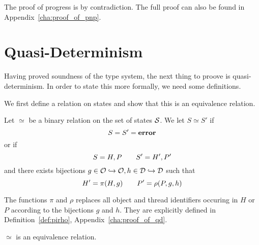 The proof of progress is by contradiction. The full proof can also be found in
Appendix~\ref{cha:proof_of_pnp}.

\section{Quasi-Determinism}%
\label{sec:quasi_determinism}

Having proved soundness of the type system, the next thing to proove is
quasi-determinism. In order to state this more formally, we need some
definitions.

We first define a relation on states and show that this is an equivalence
relation.
\begin{definition} \label{def:eqrel}
  Let $\simeq$ be a binary relation on the set of states $\mathcal{S}$.
  We let $S \simeq S'$ if
  \begin{equation*}
    S = S' = \mbox{{\bf error}}
  \end{equation*}
  or if
  \begin{equation}
    S = H, P \quad\quad S' = H', P'
  \end{equation}
  and there exists bijections $g \in \mathcal{O} \hookrightarrow \mathcal{O}, h \in \mathcal{D}
  \hookrightarrow \mathcal{D}$ such that
  \begin{equation}
    H' = \pi(H, g) \quad\quad P' = \rho(P, g, h)
  \end{equation}
  
  The functions $\pi$ and $\rho$ replaces all object and thread identifiers
  occuring in $H$ or $P$ according to the bijections $g$ and $h$. They are
  explicitly defined in Definition~\ref{def:pirho},
  Appendix~\ref{cha:proof_of_qd}.
\end{definition}



\begin{proposition} \label{prop:eqrel}
  $\simeq$ is an equivalence relation.
\end{proposition}

